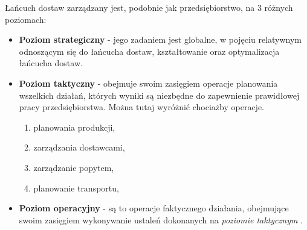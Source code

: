 		Łańcuch dostaw zarządzany jest, podobnie jak przedsiębiorstwo, na 3 różnych poziomach:
		\begin{itemize}
			\item \textbf{Poziom strategiczny} 	- jego zadaniem jest globalne,
			w pojęciu relatywnym odnoszącym się do łańcucha dostaw, kształtowanie oraz optymalizacja
			łańcucha dostaw.
			\item \textbf{Poziom taktyczny}		- obejmuje swoim zasięgiem operacje planowania wszelkich działań, 
			których	wyniki są niezbędne do zapewnienie prawidłowej pracy przedsiębiorstwa. Można tutaj wyróżnić 
			chociażby operacje.
			\begin{enumerate}
				\item planowania produkcji,
				\item zarządzania dostawcami,
				\item zarządzanie popytem,
				\item planowanie transportu,
			\end{enumerate}
			\item \textbf{Poziom operacyjny} 	- są to operacje faktycznego działania, obejmujące swoim zasięgiem
			wykonywanie ustaleń dokonanych na \emph{poziomie taktycznym} \cite{ewolucja_lancuchow_dostaw_cz1}.
		\end{itemize}
	
	